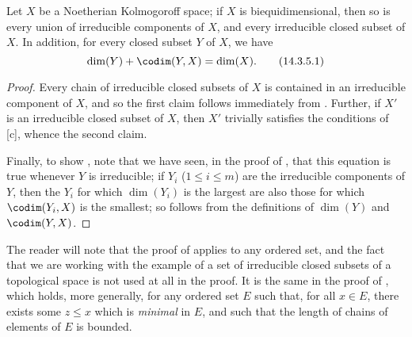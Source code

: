 \begin{cor}[14.3.5]
\label{0.14.3.5}
Let $X$ be a Noetherian Kolmogoroff space; if $X$ is biequidimensional, then so is every union of irreducible components of $X$, and every irreducible closed subset of $X$.
In addition, for every closed subset $Y$ of $X$, we have
\[
\label{0.14.3.5.1}
  \dim(Y)+\codim(Y,X)=\dim(X).
  \tag{14.3.5.1}
\]
\end{cor}

\begin{proof}
\label{proof-0.14.3.5}
Every chain of irreducible closed subsets of $X$ is contained in an irreducible component of $X$, and so the first claim follows immediately from .
Further, if $X'$ is an irreducible closed subset of $X$, then $X'$ trivially satisfies the conditions of [c], whence the second claim.

Finally, to show , note that we have seen, in the proof of , that this equation is true whenever $Y$ is irreducible;
if $Y_i$ ($1\leq i\leq m$) are the irreducible components of $Y$, then the $Y_i$ for which $\dim(Y_i)$ is the largest are also those for which $\codim(Y_i,X)$ is the smallest;
so  follows from the definitions of $\dim(Y)$ and $\codim(Y,X)$.
\end{proof}

\begin{rmk}[14.3.6]
\label{0.14.3.6}
The reader will note that the proof of  applies to any ordered set, and the fact that we are working with the example of a set of irreducible closed subsets of a topological space is not used at all in the proof.
It is the same in the proof of , which holds, more generally, for any ordered set $E$ such that, for all $x\in E$, there exists some $z\leq x$ which is \emph{minimal} in $E$, and such that the length of chains of elements of $E$ is bounded.
\end{rmk}
